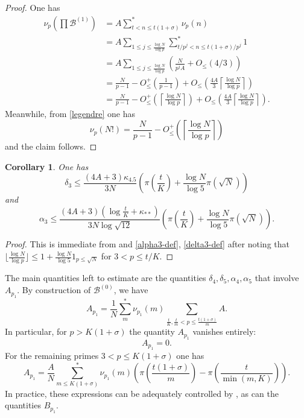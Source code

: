 \documentclass[10pt,a4paper,reqno]{amsart}
\numberwithin{equation}{section}
\theoremstyle{plain}
\newtheorem{corollary}[theorem]{Corollary}
\theoremstyle{definition}
\newcommand\tuple{{\mathcal B}}
\begin{document}
\begin{proof}
One has
  \begin{align*}
    \nu_p(\prod \tuple^{(1)}) &= A \sum_{t < n \leq t(1+\sigma)}^* \nu_p(n) \\
    &= A \sum_{1 \leq j \leq \frac{\log N}{\log p}} \sum_{t/p^j < n \leq t(1+\sigma)/p^j}^* 1 \\
    &= A \sum_{1 \leq j \leq \frac{\log N}{\log p}} \left(\frac{N}{p^j A} + O_{\leq}(4/3)\right) \\
    &= \frac{N}{p-1} - O_{\leq}^+\left(\frac{1}{p-1}\right)
    + O_{\leq}\left(\frac{4A}{3} \left\lceil \frac{\log N}{\log p}  \right\rceil\right) \\
    &= \frac{N}{p-1} 
    - O_{\leq}^+\left(\left\lceil \frac{\log N}{\log p}  \right\rceil\right)
    + O_{\leq}\left(\frac{4A}{3} \left\lceil \frac{\log N}{\log p}  \right\rceil\right).
  \end{align*}
  Meanwhile, from \eqref{legendre} one has
  $$ \nu_p(N!) = \frac{N}{p-1} - O_{\leq}^+\left(\left\lceil \frac{\log N}{\log p}  \right\rceil\right)$$
and the claim follows.  
\end{proof}

\begin{corollary}\label{delta3-alpha3-bound} One has
$$ \delta_3 \leq \frac{(4A+3)\kappa_{4.5}}{3N} \left(\pi\left(\frac{t}{K} \right) + \frac{\log N}{\log 5} \pi\left(\sqrt{N}\right)\right)$$
and
$$ \alpha_3 \leq \frac{(4A+3) \left(\log \frac{t}{K} + \kappa_{**}\right)}{3N\log \sqrt{12}}  \left(\pi\left(\frac{t}{K} \right) + \frac{\log N}{\log 5} \pi\left(\sqrt{N}\right)\right).$$
\end{corollary}

\begin{proof} This is immediate from  and \eqref{alpha3-def}, \eqref{delta3-def} after noting that $\lfloor \frac{\log N}{\log p} \rfloor \leq 1 + \frac{\log N}{\log 5} 1_{p \leq \sqrt{N}}$ for $3 < p \leq t/K$.
\end{proof}

The main quantities left to estimate are the quantities $\delta_4, \delta_5, \alpha_4, \alpha_5$ that involve $A_{p_1}$.  By construction of $\tuple^{(0)}$, we have
$$
A_{p_1} = \frac{1}{N} \sum_m^* \nu_{p_1}(m) \sum_{\frac{t}{K}, \frac{t}{m} < p \leq \frac{t(1+\sigma)}{m}} A.
$$
In particular, for $p > K(1+\sigma)$ the quantity $A_{p_1}$ vanishes entirely:
\begin{equation}\label{ap1-vanish}
  A_{p_1} = 0.
\end{equation}
For the remaining primes $3 < p \leq K(1+\sigma)$ one has
\begin{equation}\label{ap1-small}
A_{p_1} = \frac{A}{N} \sum_{m \leq K(1+\sigma)}^* \nu_{p_1}(m) \left( \pi\left(\frac{t(1+\sigma)}{m}\right) - \pi\left(\frac{t}{\min(m,K)} \right) \right).
\end{equation}
In practice, these expressions can be adequately controlled by , as can the quantities $B_{p_1}$.
\end{document}

